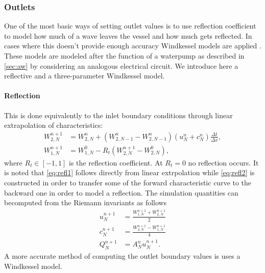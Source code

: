 \documentclass[a4paper, oneside]{discothesis}
\begin{document}
	\subsubsection{Outlets} \label{sssec:outl}
	One of the most basic ways of setting outlet values is to use reflection coefficient to model how much of a wave leaves the vessel and how much gets reflected.
	In cases where this doesn't provide enough accuracy Windkessel models are applied \cite {formaggia2010cardiovascular}.
	These models are modeled after the function of a waterpump as described in \autoref{sec:aw} by considering an analogous electrical circuit.
	We introduce here a reflective and a three-parameter Windkessel model.

	\paragraph{Reflection} \label{par:refl}
	This is done equivalently to the inlet boundary conditions through linear extrapolation of characteristics:
	\begin{align}
		W_{2,N}^{n+1}&=W_{2,N}^n+(W_{2,N-1}^n-W_{2,N-1}^n) (u_N^n+c_N^n) \frac{\Delta t}{\Delta x}, \label{eq:refl1} \\
		W_{1,N}^{n+1}&=W_{1,N}^0-R_t (W_{2,N}^{n+1}-W_{2,N}^0) \label{eq:refl2},
	\end{align}
	where $R_t \in [-1,1]$ is the reflection coefficient.
	At $R_t = 0$ no reflection occurs.
	It is noted that \autoref{eq:refl1} follows directly from linear extrpolation while \autoref{eq:refl2} is constructed in order to transfer some of the forward characteristic curve to the backward one in order to model a reflection.
	The simulation quantities can becomputed from the Riemann invariants as follows
	\begin{align}
		u_N^{n+1} &= \frac{W_{1,N}^{n+1} + W_{2,N}^{n+1}}{2} \\
		c_N^{n+1} &= \frac{W_{2,N}^{n+1} - W_{1,N}^{n+1}}{4} \\
		Q_N^{n+1} &= A_N^n u_N^{n+1}.
	\end{align}
	A more accurate method of computing the outlet boundary values is uses a Windkessel model.
\end{document}
